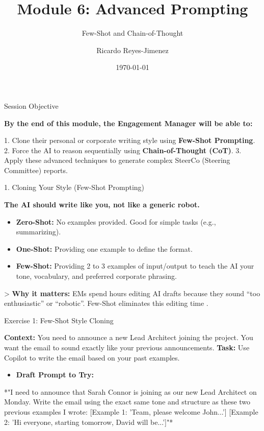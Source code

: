 \documentclass[aspectratio=169]{beamer}
\title[Module 6: Advanced Prompting]{Module 6: Advanced Prompting}
\subtitle{Few-Shot and Chain-of-Thought}
\author{Ricardo Reyes-Jimenez}
\institute{Capgemini}
\date{\today}
\begin{document}
\begin{frame}
  \titlepage
\end{frame}

\usebackgroundtemplate{}



\begin{frame}[fragile]{Session Objective}


\textbf{By the end of this module, the Engagement Manager will be able to:}

1. Clone their personal or corporate writing style using \textbf{Few-Shot Prompting}.
2. Force the AI to reason sequentially using \textbf{Chain-of-Thought (CoT)}.
3. Apply these advanced techniques to generate complex SteerCo (Steering Committee) reports.

\end{frame}



\begin{frame}[fragile]{1. Cloning Your Style (Few-Shot Prompting)}


\textbf{The AI should write like you, not like a generic robot.}

\begin{itemize}
  \item \textbf{Zero-Shot:} No examples provided. Good for simple tasks (e.g., summarizing).
  \item \textbf{One-Shot:} Providing one example to define the format.
  \item \textbf{Few-Shot:} Providing 2 to 3 examples of input/output to teach the AI your tone, vocabulary, and preferred corporate phrasing.
\end{itemize}
> \textbf{Why it matters:} EMs spend hours editing AI drafts because they sound ``too enthusiastic'' or ``robotic''. Few-Shot eliminates this editing time \cite{fewshot2025}.

\end{frame}



\begin{frame}[fragile]{Exercise 1: Few-Shot Style Cloning}


\textbf{Context:} You need to announce a new Lead Architect joining the project. You want the email to sound exactly like your previous announcements.
\textbf{Task:} Use Copilot to write the email based on your past examples.

\begin{itemize}
  \item \textbf{Draft Prompt to Try:}
\end{itemize}
*"I need to announce that Sarah Connor is joining as our new Lead Architect on Monday. Write the email using the exact same tone and structure as these two previous examples I wrote:
[Example 1: 'Team, please welcome John...']
[Example 2: 'Hi everyone, starting tomorrow, David will be...']"*

\end{frame}
\end{document}
